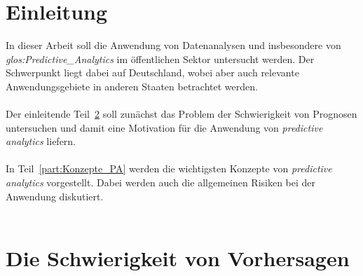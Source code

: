 \chapter{Einleitung}

In dieser Arbeit soll die Anwendung von Datenanalysen und insbesondere
von \emph{\gls{glos:Predictive_Analytics}} im öffentlichen Sektor untersucht
werden.
Der Schwerpunkt liegt dabei auf Deutschland, wobei aber auch relevante
Anwendungsgebiete in anderen Staaten betrachtet werden. \\ \\
Der einleitende Teil~\ref{part:Schw_Vorhersagen} soll zunächst das Problem der
Schwierigkeit von
Prognosen untersuchen und damit eine Motivation für die Anwendung von 
\emph{predictive analytics} liefern. \\ \\
In Teil~\ref{part:Konzepte_PA} werden die wichtigsten Konzepte von
\emph{predictive analytics} vorgestellt. Dabei werden auch die allgemeinen
Risiken bei der Anwendung diskutiert. \\ \\

\chapter{Die Schwierigkeit von Vorhersagen}
\label{part:Schw_Vorhersagen}

